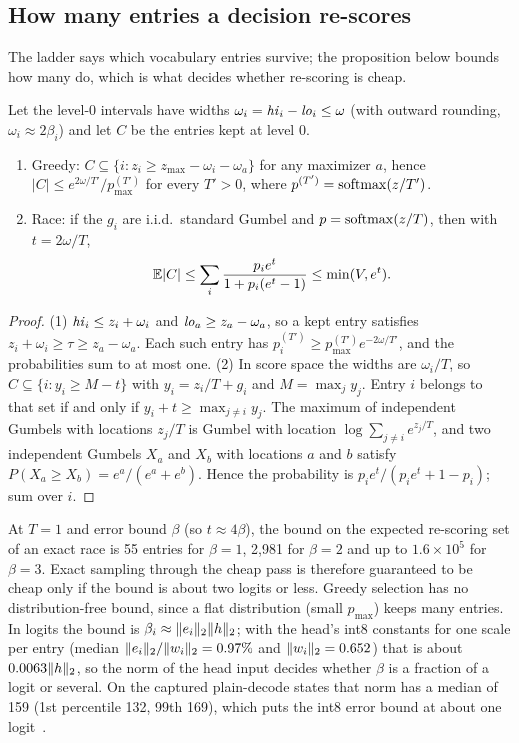 \subsection{How many entries a decision re-scores}\label{app:candidates}
The ladder says which vocabulary entries survive; the proposition below bounds how many do, which is what decides whether re-scoring is cheap.
\begin{proposition}\label{prop:candidates}
Let the level-0 intervals have widths $\omega_i=\mathit{hi}_i-\mathit{lo}_i\le\omega$ (with outward rounding, $\omega_i\approx2\beta_i$) and let $C$ be the entries kept at level 0.
\begin{enumerate}
\item Greedy: $C\subseteq\{i:z_i\ge z_{\max}-\omega_i-\omega_a\}$ for any maximizer $a$, hence $|C|\le e^{2\omega/T'}/p^{(T')}_{\max}$ for every $T'>0$, where $p^{(T')}=\operatorname{softmax}(z/T')$.
\item Race: if the $g_i$ are i.i.d.\ standard Gumbel and $p=\operatorname{softmax}(z/T)$, then with $t=2\omega/T$,
\[\mathbb E|C|\le\sum_i\frac{p_ie^t}{1+p_i(e^t-1)}\le\min(V,e^t).\]
\end{enumerate}
\end{proposition}
\begin{proof}
(1) $\mathit{hi}_i\le z_i+\omega_i$ and $\mathit{lo}_a\ge z_a-\omega_a$, so a kept entry satisfies $z_i+\omega_i\ge\tau\ge z_a-\omega_a$. Each such entry has $p^{(T')}_i\ge p^{(T')}_{\max}e^{-2\omega/T'}$, and the probabilities sum to at most one. (2) In score space the widths are $\omega_i/T$, so $C\subseteq\{i:y_i\ge M-t\}$ with $y_i=z_i/T+g_i$ and $M=\max_jy_j$. Entry $i$ belongs to that set if and only if $y_i+t\ge\max_{j\ne i}y_j$. The maximum of independent Gumbels with locations $z_j/T$ is Gumbel with location $\log\sum_{j\ne i}e^{z_j/T}$, and two independent Gumbels $X_a$ and $X_b$ with locations $a$ and $b$ satisfy $P(X_a\ge X_b)=e^a/(e^a+e^b)$. Hence the probability is $p_ie^t/(p_ie^t+1-p_i)$; sum over $i$.
\end{proof}
At $T=1$ and error bound $\beta$ (so $t\approx4\beta$), the bound on the expected re-scoring set of an exact race is 55 entries for $\beta=1$, 2,981 for $\beta=2$ and up to $1.6\times10^5$ for $\beta=3$. Exact sampling through the cheap pass is therefore guaranteed to be cheap only if the bound is about two logits or less. Greedy selection has no distribution-free bound, since a flat distribution (small $p_{\max}$) keeps many entries. In logits the bound is $\beta_i\approx\lVert e_i\rVert_2\lVert h\rVert_2$; with the head's int8 constants for one scale per entry (median $\lVert e_i\rVert_2/\lVert w_i\rVert_2=0.97\%$ and $\lVert w_i\rVert_2=0.652$) that is about $0.0063\lVert h\rVert_2$, so the norm of the head input decides whether $\beta$ is a fraction of a logit or several. On the captured plain-decode states that norm has a median of 159 (1st percentile 132, 99th 169), which puts the int8 error bound at about one logit~.

